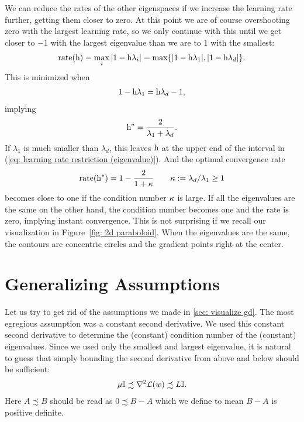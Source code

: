 We can reduce the rates of the other eigenspaces if we
increase the learning rate further, getting them closer to zero. At this point
we are of course overshooting zero with the largest learning rate, so we only
continue with this until we get closer to \(-1\) with the largest eigenvalue
than we are to \(1\) with the smallest:
%
\begin{align*}
	\text{rate}(\text{h})=\max_{i} |1-\text{h}\lambda_i| = \max\{|1-\text{h}\lambda_1|, |1-\text{h}\lambda_d|\}.
\end{align*}
%
This is minimized when
%
\begin{align*}
	1-\text{h}\lambda_1 = \text{h}\lambda_d -1,
\end{align*}
%
implying
%
\begin{align}\label{eq: optimal SGD lr eigenvalue representation}
	\text{h}^* = \frac{2}{\lambda_1 + \lambda_d}.
\end{align}
%
If \(\lambda_1\) is much smaller than \(\lambda_d\), this leaves \(\text{h}\)
at the upper end of the interval in (\ref{eq: learning rate restriction
(eigenvalue)}). And the optimal convergence rate
%
\begin{align*}
	\text{rate}(\text{h}^*)
	= 1 - \frac{2}{1+\kappa}
	\qquad \kappa:=\lambda_d/\lambda_1 \ge 1
\end{align*}
%
becomes close to one if the condition number \(\kappa\) is large.
If all the eigenvalues are the same on the other hand, the condition number
becomes one and the rate is zero, implying instant convergence. This is not
surprising if we recall our visualization in Figure~\ref{fig: 2d paraboloid}.
When the eigenvalues are the same, the contours are concentric circles and the
gradient points right at the center.

\section{Generalizing Assumptions}

Let us try to get rid of the assumptions we made in \ref{sec: visualize gd}.
The most egregious assumption was a constant second derivative. We used this
constant second derivative to determine the (constant) condition number of
the (constant) eigenvalues. Since we used only the smallest and largest
eigenvalue, it is natural to guess that simply bounding the second derivative
from above and below should be sufficient:
%
\begin{align*}
	\mu \mathbb{I} \precsim \nabla^2 \mathcal{L}(w) \precsim L \mathbb{I}.
\end{align*}
%
Here \(A \precsim B\) should be read as \(0\precsim B-A\) which we define to mean
\(B-A\) is positive definite.

